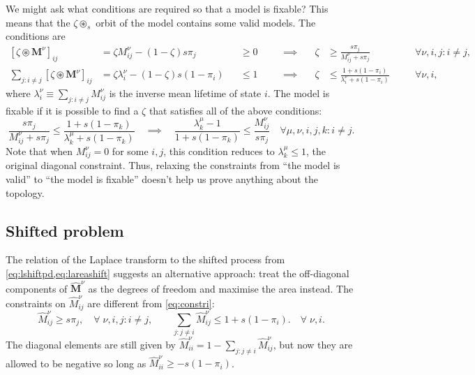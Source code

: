\documentclass[12pt]{article}
\newcommand{\eqm}{\pi}
\newcommand{\lbm}{\lambda}
\newcommand{\MMdm}{M}
\newcommand{\MMd}{\mathbf{\MMdm}}
\newcommand{\shift}[1]{\widehat{#1}}
\begin{document}
We might ask what conditions are required so that a model is fixable?
This means that the \(\zeta \circledast_s \) orbit of the model contains some valid models.
The conditions are
%
\begin{equation*}
\begin{alignedat}{5}
  [\zeta \circledast \MMd^\nu]_{ij}  
    &= \zeta \MMdm^\nu_{ij} - (1-\zeta) s \eqm_j 
    &&\geq 0 &
  \quad &\implies \quad &
  \zeta &\geq \frac{s \eqm_j}{\MMdm^\nu_{ij} + s \eqm_j} &
    &\forall \nu, i, j : i \neq j , \\
  \sum_{j : i \neq j} [\zeta \circledast \MMd^\nu]_{ij} 
    &= \zeta \lbm^\nu_i - (1-\zeta) s (1-\eqm_i) 
    &&\leq 1 &
  &\implies &
  \zeta &\leq \frac{1 + s (1-\eqm_i)}{\lbm^\nu_i + s (1-\eqm_i)} &
    \quad &\forall \nu, i ,
\end{alignedat}
\end{equation*}
%
where \(\lbm^\nu_i \equiv \sum_{j : i \neq j} \MMdm^\nu_{ij}\) is the inverse mean  lifetime of state \(i\).
The model is fixable if it is possible to find a \(\zeta\) that satisfies all of the above conditions:
%
\begin{equation}\label{eq:fixable}
  \frac{s \eqm_j}{\MMdm^\nu_{ij} + s \eqm_j} \leq \frac{1 + s (1-\eqm_k)}{\lbm^\mu_k + s (1-\eqm_k)}
  \quad \implies \quad
  \frac{\lbm^\mu_k - 1}{1 + s (1-\eqm_k)} \leq \frac{\MMdm^\nu_{ij}}{s \eqm_j} 
  \quad \forall \mu, \nu, i, j, k : i \neq j.
\end{equation}
%
Note that when \(\MMdm^\nu_{ij} = 0\) for some \(i,j \), this condition reduces to \(\lbm^\mu_k \leq 1\), the original diagonal constraint.
Thus, relaxing the constraints from ``the model is valid'' to ``the model is fixable'' doesn't help us prove anything about the topology.



\subsection{Shifted problem}\label{sec:lshift}

The relation of the Laplace transform to the shifted process from \cref{eq:lshiftpd,eq:lareashift} suggests an alternative approach: 
treat the off-diagonal components of \(\shift{\MMd}^\nu \) as the degrees of freedom and maximise the area instead.
The constraints on \(\shift{\MMdm}^\nu_{ij}\) are different from \cref{eq:constri}:
%
\begin{equation}\label{eq:lshiftconstr}
  \shift{\MMdm}^\nu_{ij} \geq s \eqm_j,
    \quad \forall \; \nu, i, j : i \neq j, \qquad
  \sum_{j: j \neq i} \shift{\MMdm}^\nu_{ij} \leq 1 + s (1 - \eqm_i).
    \quad \forall \; \nu, i.
\end{equation}
%
The diagonal elements are still given by \( \shift{\MMdm}^\nu_{ii} = 1 - \sum_{j: j \neq i} \shift{\MMdm}^\nu_{ij} \), but now they are allowed to be negative so long as \(\shift{\MMdm}^\nu_{ii} \geq - s (1 - \eqm_i)\).
\end{document}
